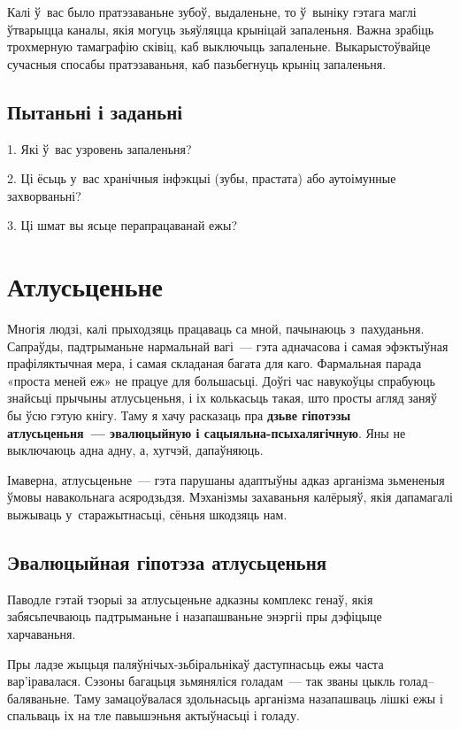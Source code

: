 Калі ў~вас было пратэзаваньне зубоў, выдаленьне, то ў~выніку гэтага маглі ўтварыцца каналы, якія могуць зьяўляцца крыніцай запаленьня. Важна зрабіць трохмерную тамаграфію сківіц, каб выключыць запаленьне. Выкарыстоўвайце сучасныя спосабы пратэзаваньня, каб пазьбегнуць крыніц запаленьня.

\subsection*{Пытаньні і заданьні}

1. Які ў~вас узровень запаленьня?

2. Ці ёсьць у~вас хранічныя інфэкцыі (зубы, прастата) або аутоімунные захворваньні?

3. Ці шмат вы ясьце перапрацаванай ежы?


\section{Атлусьценьне}

Многія людзі, калі прыходзяць працаваць са мной, пачынаюць з~пахуданьня. Сапраўды, падтрыманьне нармальнай вагі~--- гэта адначасова і самая эфэктыўная прафіляктычная мера, і самая складаная багата для каго. Фармальная парада «проста меней еж» не працуе для большасьці. Доўгі час навукоўцы спрабуюць знайсьці прычыны атлусьценьня, і іх колькасьць такая, што просты агляд заняў бы ўсю гэтую кнігу. Таму я хачу расказаць пра \textbf{дзьве гіпотэзы атлусьценьня~--- эвалюцыйную і сацыяльна-псыхалягічную}. Яны не выключаюць адна адну, а, хутчэй, дапаўняюць.

Імаверна, атлусьценьне~--- гэта парушаны адаптыўны адказ арганізма зьмененыя ўмовы навакольнага асяродзьдзя. Мэханізмы захаваньня калёрыяў, якія дапамагалі выжываць у~старажытнасьці, сёньня шкодзяць нам.

\subsection*{Эвалюцыйная гіпотэза атлусьценьня}

Паводле гэтай тэорыі за атлусьценьне адказны комплекс генаў, якія забясьпечваюць падтрыманьне і назапашваньне энэргіі пры дэфіцыце харчаваньня.

Пры ладзе жыцьця паляўнічых-зьбіральнікаў даступнасьць ежы часта вар'іравалася. Сэзоны багацьця зьмяняліся голадам~--- так званы цыкль голад--баляваньне. Таму замацоўвалася здольнасьць арганізма назапашваць лішкі ежы і спальваць іх на тле павышэньня актыўнасьці і голаду. 

